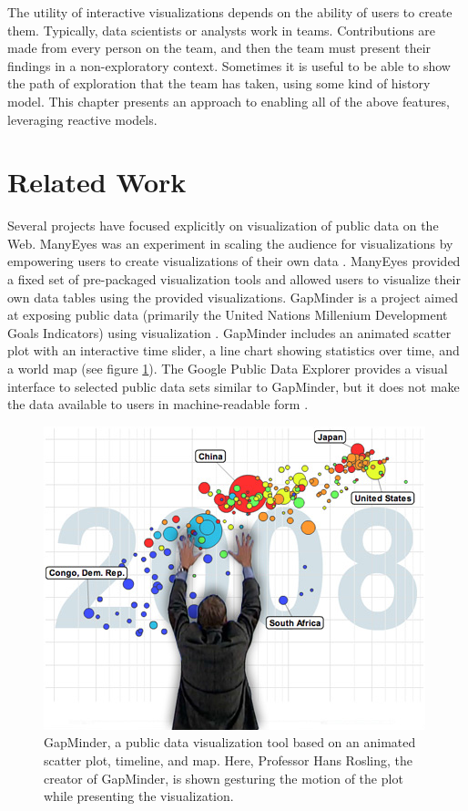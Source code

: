 The utility of interactive visualizations depends on the ability of users to create them. Typically, data scientists or analysts work in teams. Contributions are made from every person on the team, and then the team must present their findings in a non-exploratory context. Sometimes it is useful to be able to show the path of exploration that the team has taken, using some kind of history model. This chapter presents an approach to enabling all of the above features, leveraging reactive models.

\section{Related Work}
Several projects have focused explicitly on visualization of public data on the Web. ManyEyes was an experiment in scaling the audience for visualizations by empowering users to create visualizations of their own data \cite{viegas2007manyeyes}. ManyEyes provided a fixed set of pre-packaged visualization tools and allowed users to visualize their own data tables using the provided visualizations. GapMinder is a project aimed at exposing public data (primarily the United Nations Millenium Development Goals Indicators) using visualization \cite{rosling2005new}. GapMinder includes an animated scatter plot with an interactive time slider, a line chart showing statistics over time, and a world map (see figure \ref{fig:gapminder}). The Google Public Data Explorer provides a visual interface to selected public data sets similar to GapMinder, but it does not make the data available to users in machine-readable form \cite{googlePublicDataExplorer}.

\begin{figure}[h!]
  \centering
  \includegraphics[width=\figureWidth]{figs/gapminder.jpg}
  \caption[GapMinder and Hans Rosling.]
   {GapMinder, a public data visualization tool based on an animated scatter plot, timeline, and map. Here, Professor Hans Rosling, the creator of GapMinder, is shown gesturing the motion of the plot while presenting the visualization.}
  \label{fig:gapminder}
\end{figure}
\pagebreak

